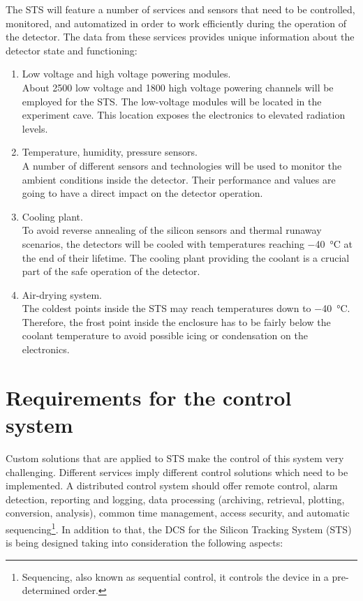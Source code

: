 The \gls{STS} will feature a number of services and sensors that need to be controlled, monitored, and automatized in order to work efficiently during the operation of the detector. The data from these services provides unique information about the detector state and functioning:
\begin{enumerate}
    \item Low voltage and high voltage powering modules.\\
    About 2500 low voltage and 1800 high voltage powering channels will be employed for the \gls{STS}. The low-voltage modules will be located in the experiment cave. This location exposes the electronics to elevated radiation levels. 
    \item Temperature, humidity, pressure sensors.\\
    A number of different sensors and technologies will be used to monitor the ambient conditions inside the detector. Their performance and values are going to have a direct impact on the detector operation.
    \item Cooling plant.\\
    To avoid reverse annealing of the silicon sensors and thermal runaway scenarios, the detectors will be cooled with temperatures reaching \SI{-40}{\celsius} at the end of their lifetime. The cooling plant providing the coolant is a crucial part of the safe operation of the detector.
    \item Air-drying system.\\
    The coldest points inside the \gls{STS} may reach temperatures down to \SI{-40}{\celsius}. Therefore, the frost point inside the enclosure has to be fairly below the coolant temperature to avoid possible icing or condensation on the electronics.
 \end{enumerate}



\section{Requirements for the control system}
\label{sys:req}
Custom solutions that are applied to \gls{STS} make the control of this system very challenging. Different services imply different control solutions which need to be implemented.
A distributed control system should offer remote control, alarm detection, reporting and logging, data processing (archiving, retrieval, plotting, conversion, analysis), common time management, access security, and automatic sequencing\footnote{Sequencing, also known as sequential control, it controls the device in a pre-determined order.}.
In addition to that, the \gls{DCS} for the Silicon Tracking System (\gls{STS}) is being designed taking into consideration the following aspects:


